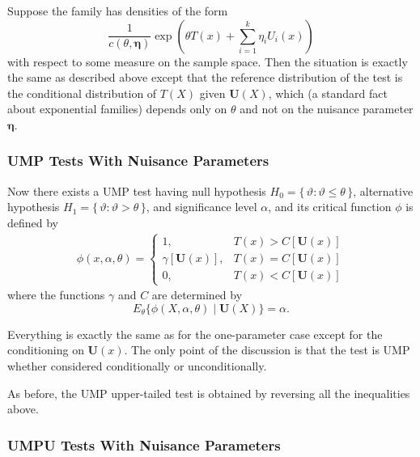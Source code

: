 \documentclass{article}
\newcommand{\set}[1]{\{\, #1 \,\}}
\begin{document}
Suppose the family has densities of the form
$$
   \frac{1}{c(\theta, \boldsymbol{\eta})}
   \exp\left( \theta T(x) + \sum_{i = 1}^k \eta_i U_i(x) \right)
$$
with respect to some measure on the sample space.  Then the situation
is exactly the same as described above except that the reference distribution
of the test is the conditional distribution of $T(X)$ given $\mathbf{U}(X)$,
which (a standard fact about exponential families) depends only on $\theta$
and not on the nuisance parameter $\boldsymbol{\eta}$.

\subsubsection{UMP Tests With Nuisance Parameters}

Now there exists a UMP test
having null hypothesis $H_0 = \set{ \vartheta : \vartheta \le \theta }$,
alternative hypothesis $H_1 = \set{ \vartheta : \vartheta > \theta }$,
and significance level $\alpha$,
and its critical function $\phi$ is defined by
\begin{equation} \label{eq:crit-lower}
\begin{split}
   \phi(x, \alpha, \theta)
   =
   \begin{cases}
   1, & T(x) > C[\mathbf{U}(x)]
   \\
   \gamma[\mathbf{U}(x)], & T(x) = C[\mathbf{U}(x)]
   \\
   0, & T(x) < C[\mathbf{U}(x)]
   \end{cases}
\end{split}
\end{equation}
where the functions $\gamma$ and $C$ are determined by
\begin{equation} \label{eq:cond-lower}
   E_\theta\{\phi(X, \alpha, \theta) \mid \mathbf{U}(X) \} = \alpha.
\end{equation}

Everything is exactly the same as for the one-parameter case except
for the conditioning on $\mathbf{U}(x)$.  The only point of the discussion
is that the test is UMP whether considered conditionally or unconditionally.

As before, the UMP upper-tailed test is obtained by reversing all the
inequalities above.

\subsubsection{UMPU Tests With Nuisance Parameters}
\end{document}
